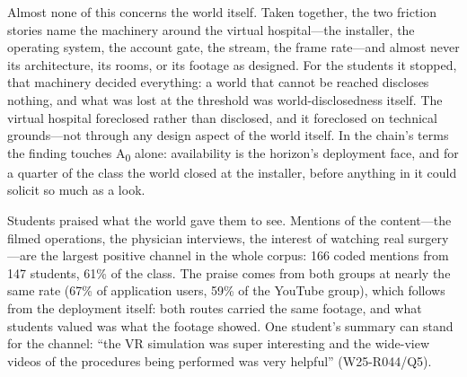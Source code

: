 Almost none of this concerns the world itself. Taken together, the two
friction stories name the machinery around the virtual hospital---the
installer, the operating system, the account gate, the stream, the frame
rate---and almost never its architecture, its rooms, or its footage as
designed. For the students it stopped, that machinery decided everything: a
world that cannot be reached discloses nothing, and what was lost at the
threshold was world-disclosedness itself. The virtual hospital foreclosed
rather than disclosed, and it foreclosed on technical grounds---not through
any design aspect of the world itself. In the chain's
terms the finding touches A\textsubscript{0} alone: availability is the
horizon's deployment face, and for a quarter of the class the world closed
at the installer, before anything in it could solicit so much as a look.


Students praised what the world gave them to see. Mentions of the
content---the filmed operations, the physician interviews, the interest of
watching real surgery---are the largest positive channel in the whole
corpus: 166 coded mentions from 147 students, 61\% of the class. The praise
comes from both groups at nearly the same rate (67\% of application users,
59\% of the YouTube group), which follows from the deployment itself: both
routes carried the same footage, and what students valued was what the
footage showed. One student's summary can stand for the channel: ``the VR
simulation was super interesting and the wide-view videos of the procedures
being performed was very helpful'' (W25-R044/Q5).

